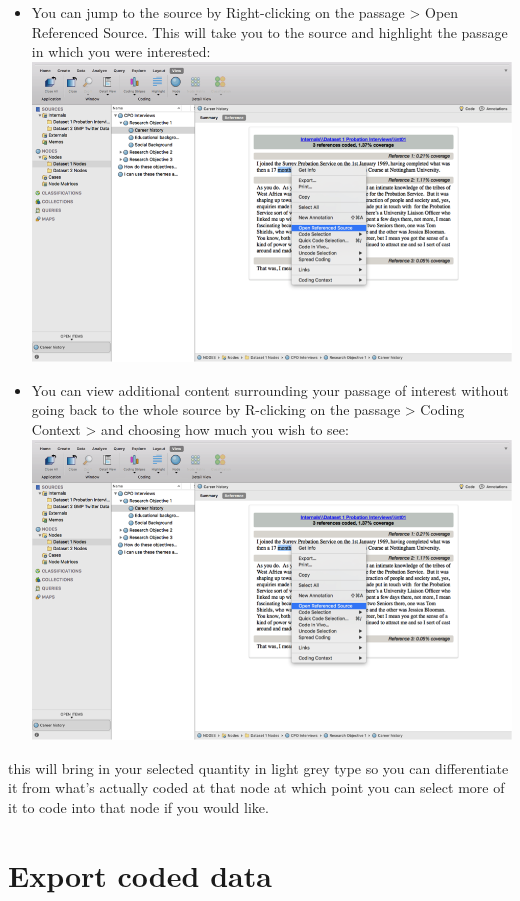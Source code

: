 \documentclass[]{book}
\providecommand{\tightlist}{%
  \setlength{\itemsep}{0pt}\setlength{\parskip}{0pt}}
\theoremstyle{definition}
\theoremstyle{definition}
\theoremstyle{definition}
\theoremstyle{remark}
\begin{document}
\begin{itemize}
\tightlist
\item
  You can jump to the source by Right-clicking on the passage
  \textgreater{} Open Referenced Source. This will take you to the
  source and highlight the passage in which you were interested:
  \includegraphics{imgs/qual_52.png}
\item
  You can view additional content surrounding your passage of interest
  without going back to the whole source by R-clicking on the passage
  \textgreater{} Coding Context \textgreater{} and choosing how much you
  wish to see: \includegraphics{imgs/qual_52.png}
\end{itemize}

this will bring in your selected quantity in light grey type so you can
differentiate it from what's actually coded at that node at which point
you can select more of it to code into that node if you would like.

\hypertarget{export-coded-data}{%
\section{Export coded data}\label{export-coded-data}}
\end{document}
